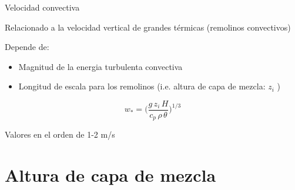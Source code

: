 \begin{frame}{Velocidad convectiva}

Relacionado a la velocidad vertical de grandes térmicas (remolinos convectivos)

Depende de:
\begin{itemize}
    \item Magnitud de la energia turbulenta convectiva
    \item Longitud de escala para los remolinos (i.e. altura de capa de mezcla: $z_i$ )
\end{itemize}
 
$$\boxed{
w_*=\bigg( \dfrac{g\,z_i\,H}{c_p\,\rho\,\theta}\bigg)^{1/3}
}
$$

Valores en el orden de 1-2 m/s

\end{frame}



\section{Altura de capa de mezcla}

